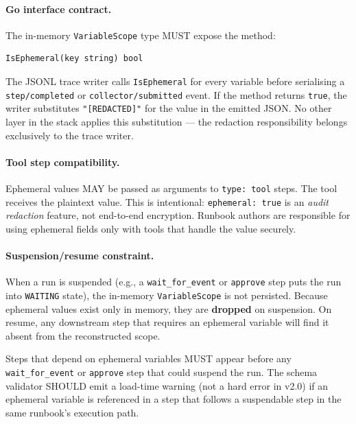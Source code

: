\paragraph{Go interface contract.}
The in-memory \texttt{VariableScope} type MUST expose the method:

\begin{verbatim}
IsEphemeral(key string) bool
\end{verbatim}

The JSONL trace writer calls \texttt{IsEphemeral} for every variable before serialising
a \texttt{step/completed} or \texttt{collector/submitted} event.  If the method returns
\texttt{true}, the writer substitutes \texttt{"[REDACTED]"} for the value in the emitted
JSON.  No other layer in the stack applies this substitution — the redaction responsibility
belongs exclusively to the trace writer.

\paragraph{Tool step compatibility.}
Ephemeral values MAY be passed as arguments to \texttt{type: tool} steps.  The tool
receives the plaintext value.  This is intentional: \texttt{ephemeral: true} is an
\emph{audit redaction} feature, not end-to-end encryption.  Runbook authors are
responsible for using ephemeral fields only with tools that handle the value securely.

\paragraph{Suspension/resume constraint.}
When a run is suspended (e.g., a \texttt{wait\_for\_event} or \texttt{approve} step
puts the run into \texttt{WAITING} state), the in-memory \texttt{VariableScope} is not
persisted.  Because ephemeral values exist only in memory, they are \textbf{dropped} on
suspension.  On resume, any downstream step that requires an ephemeral variable will
find it absent from the reconstructed scope.

\begin{tcolorbox}[colback=yellow!10,colframe=orange!60,title=Constraint: ephemeral variables and suspension]
Steps that depend on ephemeral variables MUST appear before any \texttt{wait\_for\_event}
or \texttt{approve} step that could suspend the run.  The schema validator SHOULD emit a
load-time warning (not a hard error in v2.0) if an ephemeral variable is referenced in a
step that follows a suspendable step in the same runbook's execution path.
\end{tcolorbox}

